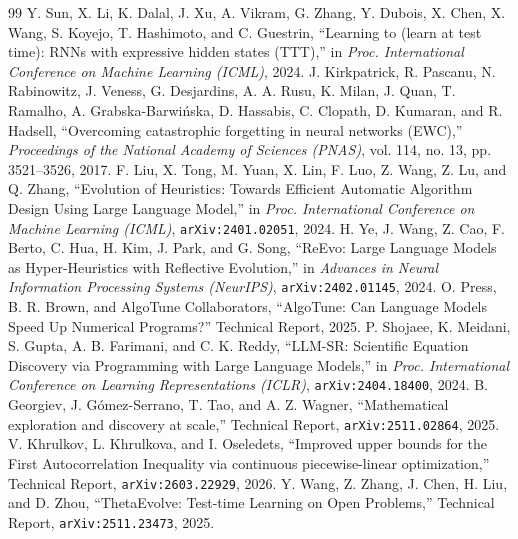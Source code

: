 \documentclass[11pt,a4paper]{article}
\begin{document}
\begin{thebibliography}{99}
 Y. Sun, X. Li, K. Dalal, J. Xu, A. Vikram, G. Zhang, Y. Dubois, X. Chen, X. Wang, S. Koyejo, T. Hashimoto, and C. Guestrin, ``Learning to (learn at test time): RNNs with expressive hidden states (TTT),'' in \emph{Proc. International Conference on Machine Learning (ICML)}, 2024.
 J. Kirkpatrick, R. Pascanu, N. Rabinowitz, J. Veness, G. Desjardins, A. A. Rusu, K. Milan, J. Quan, T. Ramalho, A. Grabska-Barwi\'{n}ska, D. Hassabis, C. Clopath, D. Kumaran, and R. Hadsell, ``Overcoming catastrophic forgetting in neural networks (EWC),'' \emph{Proceedings of the National Academy of Sciences (PNAS)}, vol. 114, no. 13, pp. 3521--3526, 2017.
 F. Liu, X. Tong, M. Yuan, X. Lin, F. Luo, Z. Wang, Z. Lu, and Q. Zhang, ``Evolution of Heuristics: Towards Efficient Automatic Algorithm Design Using Large Language Model,'' in \emph{Proc. International Conference on Machine Learning (ICML)}, \texttt{arXiv:2401.02051}, 2024.
 H. Ye, J. Wang, Z. Cao, F. Berto, C. Hua, H. Kim, J. Park, and G. Song, ``ReEvo: Large Language Models as Hyper-Heuristics with Reflective Evolution,'' in \emph{Advances in Neural Information Processing Systems (NeurIPS)}, \texttt{arXiv:2402.01145}, 2024.
 O. Press, B. R. Brown, and AlgoTune Collaborators, ``AlgoTune: Can Language Models Speed Up Numerical Programs?'' Technical Report, 2025.
 P. Shojaee, K. Meidani, S. Gupta, A. B. Farimani, and C. K. Reddy, ``LLM-SR: Scientific Equation Discovery via Programming with Large Language Models,'' in \emph{Proc. International Conference on Learning Representations (ICLR)}, \texttt{arXiv:2404.18400}, 2024.
 B. Georgiev, J. G\'{o}mez-Serrano, T. Tao, and A. Z. Wagner, ``Mathematical exploration and discovery at scale,'' Technical Report, \texttt{arXiv:2511.02864}, 2025.
 V. Khrulkov, L. Khrulkova, and I. Oseledets, ``Improved upper bounds for the First Autocorrelation Inequality via continuous piecewise-linear optimization,'' Technical Report, \texttt{arXiv:2603.22929}, 2026.
 Y. Wang, Z. Zhang, J. Chen, H. Liu, and D. Zhou, ``ThetaEvolve: Test-time Learning on Open Problems,'' Technical Report, \texttt{arXiv:2511.23473}, 2025.
\end{thebibliography}
\end{document}
